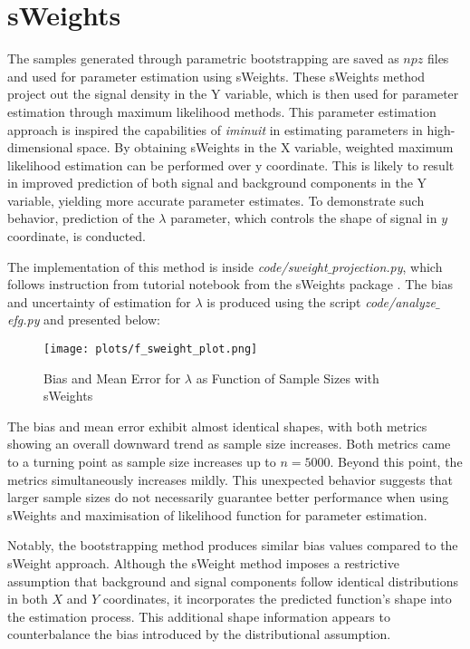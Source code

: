 \documentclass[a4paper, 12pt]{article}
\begin{document}
\section{sWeights}
\hspace{1.5em}The samples generated through parametric bootstrapping are saved as $npz$ files and used for parameter estimation using sWeights. These sWeights method project out the signal density in the Y variable, which is then used for parameter estimation through maximum likelihood methods. This parameter estimation approach is inspired the capabilities of \textit{iminuit} in estimating parameters in high-dimensional space. By obtaining sWeights in the X variable, weighted maximum likelihood estimation can be performed over y coordinate. This is likely to result in improved prediction of both signal and background components in the Y variable, yielding more accurate parameter estimates. To demonstrate such behavior, prediction of the $\lambda$ parameter, which controls the shape of signal in $y$ coordinate, is conducted. 
\par The implementation of this method is inside \textit{code/sweight$\_$projection.py}, which follows instruction from tutorial notebook from the sWeights package \cite{sweights_docs}. The bias and uncertainty of estimation for $\lambda$ is produced using the script \textit{code/analyze$\_$efg.py} and presented below:
\begin{figure}[H]
    \centering
    \texttt{[image: plots/f\_sweight\_plot.png]}
    \caption{Bias and Mean Error for $\lambda$ as Function of Sample Sizes with sWeights}
    \label{fig:enter-label}
\end{figure} 
\par The bias and mean error exhibit almost identical shapes, with both metrics showing an overall downward trend as sample size increases. Both metrics came to a turning point as sample size increases up to $n=5000$. Beyond this point, the metrics simultaneously increases mildly. This unexpected behavior suggests that larger sample sizes do not necessarily guarantee better performance when using sWeights and maximisation of likelihood function for parameter estimation.
\par Notably, the bootstrapping method produces similar bias values compared to the sWeight approach. Although the sWeight method imposes a restrictive assumption that background and signal components follow identical distributions in both $X$ and $Y$ coordinates, it incorporates the predicted function's shape into the estimation process. This additional shape information appears to counterbalance the bias introduced by the distributional assumption.
\end{document}
